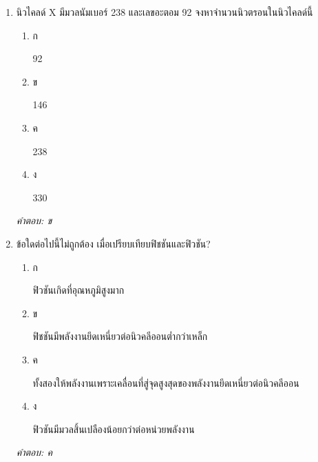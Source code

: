 \documentclass[12pt]{article}
\begin{document}
\begin{enumerate}[label=\arabic*., itemsep=0.5\baselineskip, topsep=0.5\baselineskip, leftmargin=*]
\item นิวไคลด์ X มีมวลนัมเบอร์ 238 และเลขอะตอม 92 จงหาจำนวนนิวตรอนในนิวไคลด์นี้
\begin{enumerate}[label=\alph*)., itemsep=0.3\baselineskip, topsep=0.3\baselineskip]
\item ก\ 
\begin{minipage}[t]{0.9\linewidth}
\raggedright 92
\end{minipage}
\item ข\ 
\begin{minipage}[t]{0.9\linewidth}
\raggedright 146
\end{minipage}
\item ค\ 
\begin{minipage}[t]{0.9\linewidth}
\raggedright 238
\end{minipage}
\item ง\ 
\begin{minipage}[t]{0.9\linewidth}
\raggedright 330
\end{minipage}
\end{enumerate}
\vspace{-0.3\baselineskip}
\begin{small}
\textit{คำตอบ: ข}
\end{small}

\item ข้อใดต่อไปนี้ไม่ถูกต้อง เมื่อเปรียบเทียบฟิชชันและฟิวชัน?
\begin{enumerate}[label=\alph*)., itemsep=0.3\baselineskip, topsep=0.3\baselineskip]
\item ก\ 
\begin{minipage}[t]{0.9\linewidth}
\raggedright ฟิวชันเกิดที่อุณหภูมิสูงมาก
\end{minipage}
\item ข\ 
\begin{minipage}[t]{0.9\linewidth}
\raggedright ฟิชชันมีพลังงานยึดเหนี่ยวต่อนิวคลีออนต่ำกว่าเหล็ก
\end{minipage}
\item ค\ 
\begin{minipage}[t]{0.9\linewidth}
\raggedright ทั้งสองให้พลังงานเพราะเคลื่อนที่สู่จุดสูงสุดของพลังงานยึดเหนี่ยวต่อนิวคลีออน
\end{minipage}
\item ง\ 
\begin{minipage}[t]{0.9\linewidth}
\raggedright ฟิวชันมีมวลสิ้นเปลืองน้อยกว่าต่อหน่วยพลังงาน
\end{minipage}
\end{enumerate}
\vspace{-0.3\baselineskip}
\begin{small}
\textit{คำตอบ: ค}
\end{small}


\end{enumerate}
\end{document}
